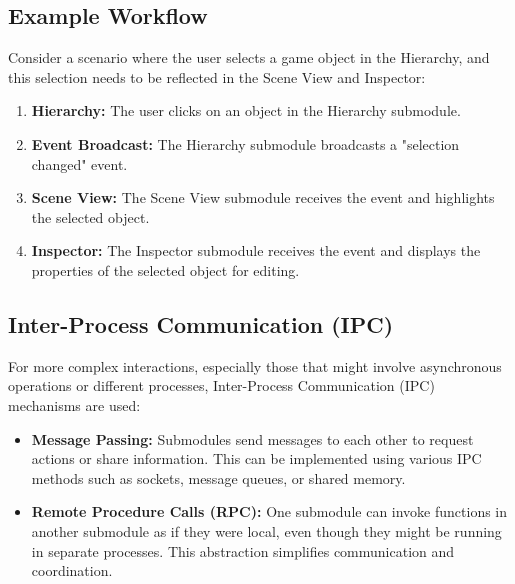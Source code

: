 \subsection*{Example Workflow}

Consider a scenario where the user selects a game object in the Hierarchy, and this selection needs to be reflected in the Scene View and Inspector:

\begin{enumerate}
    \item \textbf{Hierarchy:} The user clicks on an object in the Hierarchy submodule.
    \item \textbf{Event Broadcast:} The Hierarchy submodule broadcasts a "selection changed" event.
    \item \textbf{Scene View:} The Scene View submodule receives the event and highlights the selected object.
    \item \textbf{Inspector:} The Inspector submodule receives the event and displays the properties of the selected object for editing.
\end{enumerate}

\subsection*{Inter-Process Communication (IPC)}

For more complex interactions, especially those that might involve asynchronous operations or different processes, Inter-Process Communication (IPC) mechanisms are used:

\begin{itemize}
    \item \textbf{Message Passing:} Submodules send messages to each other to request actions or share information. This can be implemented using various IPC methods such as sockets, message queues, or shared memory.
    \item \textbf{Remote Procedure Calls (RPC):} One submodule can invoke functions in another submodule as if they were local, even though they might be running in separate processes. This abstraction simplifies communication and coordination.
\end{itemize}



